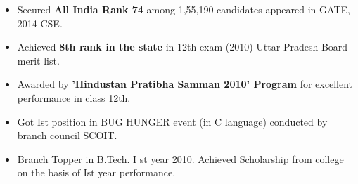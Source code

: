       \begin{itemize}
	    \item Secured \textbf{All India Rank 74} among 1,55,190 candidates appeared in GATE, 2014 CSE. \\[-0.5cm]
	    \item Achieved \textbf{8th rank in the state} in 12th exam (2010) Uttar Pradesh Board merit list. \\[-0.5cm]
	    \item Awarded by \textbf{'Hindustan Pratibha Samman 2010' Program} for excellent performance in class 12th.\\[-0.5cm]
	    \item Got Ist position in BUG HUNGER event (in C language) conducted by branch council SCOIT.\\[-0.5cm]
      	    \item Branch Topper in B.Tech. I st year 2010. Achieved Scholarship from college on the basis of Ist year performance.\\[-0.5cm]
      
\end{itemize}

